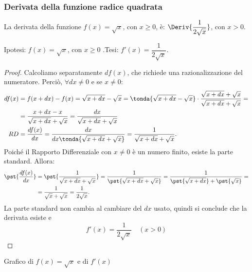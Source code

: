 \subsubsection{Derivata della funzione radice quadrata}
\label{subsubsec:f_radice}
\begin{teorema}
  La derivata della funzione \(f(x)=\sqrt{x}\), con \(x \geq 0\), è: 
\(\Deriv{\dfrac{1}{2\sqrt{x}}}\), con \(x > 0\).
\end{teorema}
\noindent Ipotesi: \(f(x)=\sqrt{x}\), con \(x\geq 0\) .\tab Tesi: 
    \(f'(x)=\dfrac{1}{2\sqrt{x}}\).
\begin{proof}
Calcoliamo separatamente \(df(x)\), che richiede una razionalizzazione 
del numeratore. 
Perciò, \(\forall dx\ne 0\) e se \(x\ne 0\):
  \begin{align*}
   df(x) &= f(x+dx)-f(x)=\sqrt{x+dx}-\sqrt{x}=
          \tonda{\sqrt{x+dx}-\sqrt{x}}\cdot
          \frac{\sqrt{x+dx}+ \sqrt{x}}{\sqrt{x+dx}+\sqrt{x}}=\\
       &=\frac{x+dx-x}{\sqrt{x+dx}+\sqrt{x}}=
         \frac{dx}{\sqrt{x+dx}+\sqrt{x}}\\
   RD&=\dfrac{df(x)}{dx}=\dfrac{dx}{dx\tonda{\sqrt{x+dx}+\sqrt{x}}}=
       \dfrac{1}{\sqrt{x+dx}+\sqrt{x}}.
  \end{align*}
Poiché il Rapporto Differenziale  con \(x\ne 0\) è un numero finito, 
esiste la parte standard. Allora:
\begin{align*}
 \pst{\dfrac{df(x)}{dx}}&= \pst{\dfrac{1}{\sqrt{x+dx}+\sqrt{x}}}=
      \dfrac{1}{\pst{\sqrt{x+dx}+\sqrt{x}}}=
      \dfrac{1}{\pst{\sqrt{x+dx}}+\pst{\sqrt{x}}}=\\
      &=\dfrac{1}{\sqrt{x}+\sqrt{x}}=\dfrac{1}{2\sqrt{x}}.
\end{align*}
La parte standard non cambia al cambiare del \(dx\) usato, quindi si 
conclude che la derivata esiste e 
\[ f'(x)=\dfrac{1}{2\sqrt{x}}\quad (x>0)\]
\end{proof}

\begin{inaccessibleblock}
\hspace{-20mm}
\end{inaccessibleblock}
\label{img:diff_cubica_con_pendenze}
\begin{center}Grafico di \(f(x)=\sqrt{x}\) e di \(f'(x)\) \end{center}

